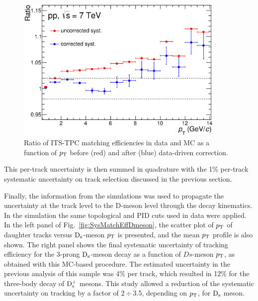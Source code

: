 \begin{enumerate}
\begin{figure}[!htb]
\begin{center}
\includegraphics[height=7cm]{FigCap4/ITSTPCmatchEffSyst_10bpass4_vsPt.eps}
\caption{Ratio of ITS-TPC matching efficiencies in data and MC as a function of $p_{\rm T}$ before (red) and after (blue) data-driven correction.}
\label{fig:MatchEffSystVsPt}
\end{center}
\end{figure}
This per-track uncertainty is then summed in quadrature with the 
1\% per-track systematic uncertainty on track selection discussed in the previous section. 
\end{enumerate}
Finally, the information from the simulations was used to propagate the uncertainty at the 
track level to the D-meson level through the decay 
kinematics. In the simulation the same topological and PID cuts used in data were 
applied. In the left panel of Fig.~\ref{fig:SysMatchEffDmeson}, the scatter plot of 
$p_{\rm T}$ of daughter tracks versus 
${\rm D_s}$-meson $p_{\rm T}$ is presented, and the mean $p_{\rm T}$ profile is also shown. 
The right panel shows the final systematic uncertainty of tracking 
efficiency for the 3-prong ${\rm D_s}$-meson decay as a function of $Ds$-meson $p_{\rm T}$, 
as obtained with this MC-based procedure.
The estimated uncertainty in the previous analysis of this sample was 4\% per track, 
which resulted in 12\% for the three-body decay of ${\rm D_s^+}$ mesons.
This study allowed a reduction of the systematic uncertainty on tracking 
by a factor of $2 \div$3.5, depending on $p_{\rm T}$, for ${\rm D_s}$ meson. 

